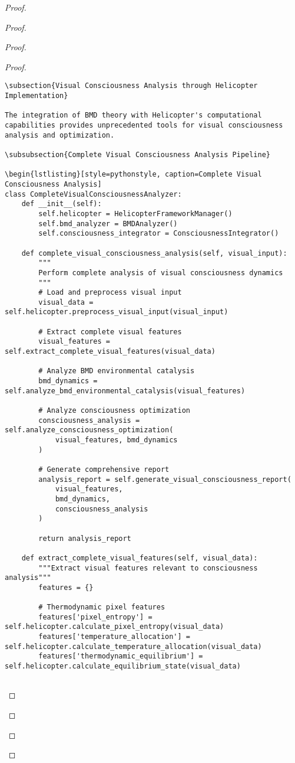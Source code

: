 \documentclass[12pt,a4paper]{article}
\begin{document}
\begin{proof}
{\begin{proof}
\begin{proof}
\begin{proof}
\begin{lstlisting}[style=pythonstyle, caption=Visual Memory BMD Integration]
\subsection{Visual Consciousness Analysis through Helicopter Implementation}

The integration of BMD theory with Helicopter's computational capabilities provides unprecedented tools for visual consciousness analysis and optimization.

\subsubsection{Complete Visual Consciousness Analysis Pipeline}

\begin{lstlisting}[style=pythonstyle, caption=Complete Visual Consciousness Analysis]
class CompleteVisualConsciousnessAnalyzer:
    def __init__(self):
        self.helicopter = HelicopterFrameworkManager()
        self.bmd_analyzer = BMDAnalyzer()
        self.consciousness_integrator = ConsciousnessIntegrator()
        
    def complete_visual_consciousness_analysis(self, visual_input):
        """
        Perform complete analysis of visual consciousness dynamics
        """
        # Load and preprocess visual input
        visual_data = self.helicopter.preprocess_visual_input(visual_input)
        
        # Extract complete visual features
        visual_features = self.extract_complete_visual_features(visual_data)
        
        # Analyze BMD environmental catalysis
        bmd_dynamics = self.analyze_bmd_environmental_catalysis(visual_features)
        
        # Analyze consciousness optimization
        consciousness_analysis = self.analyze_consciousness_optimization(
            visual_features, bmd_dynamics
        )
        
        # Generate comprehensive report
        analysis_report = self.generate_visual_consciousness_report(
            visual_features,
            bmd_dynamics,
            consciousness_analysis
        )
        
        return analysis_report
    
    def extract_complete_visual_features(self, visual_data):
        """Extract visual features relevant to consciousness analysis"""
        features = {}
        
        # Thermodynamic pixel features
        features['pixel_entropy'] = self.helicopter.calculate_pixel_entropy(visual_data)
        features['temperature_allocation'] = self.helicopter.calculate_temperature_allocation(visual_data)
        features['thermodynamic_equilibrium'] = self.helicopter.calculate_equilibrium_state(visual_data)
        

\end{lstlisting}
\end{proof}
\end{proof}
\end{proof}}
\end{proof}
\end{document}
